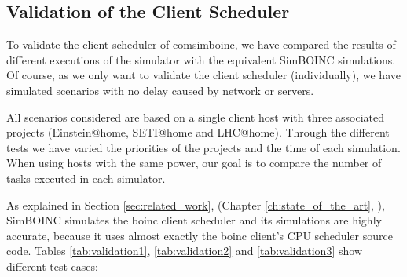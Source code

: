 \clearpage


\subsection{Validation of the Client Scheduler}
\label{subsec:validation_of_the_client_scheduler}

To validate the client scheduler of \gls{comsimboinc}, we have compared the results of different executions of the simulator with the equivalent SimBOINC simulations. Of course, as we only want to validate the client scheduler (individually), we have simulated scenarios with no delay caused by network or servers.

All scenarios considered are based on a single client host with three associated projects (Einstein@home, SETI@home and LHC@home). Through the different tests we have varied the priorities of the projects and the time of each simulation. When using hosts with the same power, our goal is to compare the number of tasks executed in each simulator.

As explained in Section \ref{sec:related_work}, \textit{} (Chapter \ref{ch:state_of_the_art}, \textit{}), SimBOINC simulates the \gls{boinc} client scheduler and its simulations are highly accurate, because it uses almost exactly the \gls{boinc} client's CPU scheduler source code. Tables \ref{tab:validation1}, \ref{tab:validation2} and \ref{tab:validation3} show different test cases:

